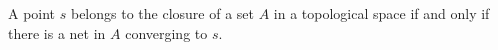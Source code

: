 A point $s$ belongs to the closure of a set $A$ in a topological space if and only if there is a net in $A$ converging to $s$.

